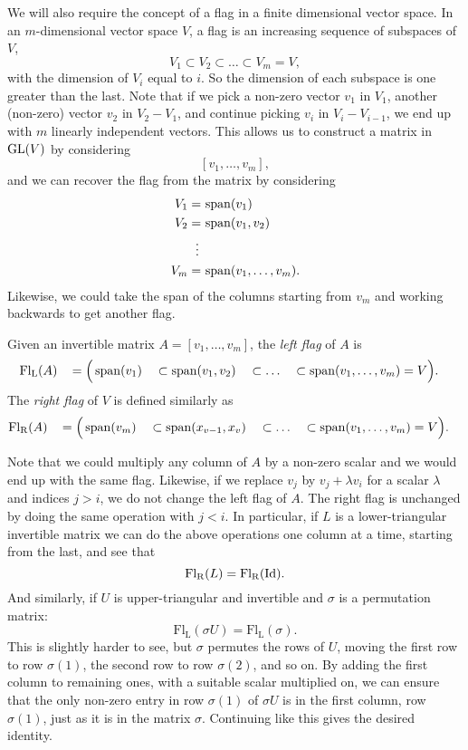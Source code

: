 We will also require the concept of a flag in a finite
dimensional vector space. In an
$m$-dimensional vector space $V$, a flag is an increasing sequence of
subspaces of $V$,
\[ V_1 \subset V_2 \subset \dots \subset V_m = V, \]
with the dimension of $V_i$ equal to $i$. So the dimension of each
subspace is one greater than the last. Note that if we pick a non-zero
vector $v_1$ in $V_1$, another (non-zero) vector $v_2$ in $V_2 - V_1$,
and continue picking $v_i$ in $V_i - V_{i-1}$, we end up with $m$
linearly independent vectors. This allows us to construct a matrix in
$\operatorname{GL}(V)$ by considering
\[ [v_1,\dots,v_m], \]
and we can recover the flag from the matrix by considering
\begin{align*}
  V_1 =\, &\operatorname{span}(v_1) \\
  V_2 =\, &\operatorname{span}(v_1,v_2) \\
  \vdots\,\, & \\
  V_m =\, &\operatorname{span}(v_1,\dots,v_m).
\end{align*}
Likewise, we could take the span of the columns starting from $v_m$
and working backwards to get another flag.
\begin{definition}
  Given an invertible matrix $A = [v_1,\dots,v_m]$, the \textit{left
    flag} of $A$ is
  \begin{alignat*}{5}
    \mathrm{Fl_L}(A)\, &&= \Big(&\operatorname{span}(v_1) &&\subset \operatorname{span}(v_1,v_2)
    &&\subset \dots &&\subset \operatorname{span}(v_1,\dots,v_m) = V\Big).
  \end{alignat*}
  The \textit{right flag} of $V$ is defined similarly as
  \begin{alignat*}{5}
    \mathrm{Fl_R}(A)\, &&= \Big(&\operatorname{span}(v_m) &&\subset
    \operatorname{span}(x_{v-1},x_v) &&\subset \dots &&\subset
    \operatorname{span}(v_1,\dots,v_m) = V\Big). 
  \end{alignat*}
\end{definition}
Note that we could multiply any column of $A$ by a non-zero scalar and
we would end up with the same flag. Likewise, if we replace $v_j$ by
$v_j + \lambda v_i$ for a scalar $\lambda$ and indices $j > i$, we do not
change the left flag of $A$. The right flag is unchanged by doing
the same operation with $j < i$. In particular, if $L$ is a
lower-triangular invertible matrix we can do the above operations one
column at a time, starting from the last, and see that
\[ \mathrm{Fl_R}(L) = \mathrm{Fl_R}(\operatorname{Id}). \]
And similarly, if $U$ is upper-triangular and invertible and $\sigma$
is a permutation matrix:
\[ \mathrm{Fl_L}(\sigma U) = \mathrm{Fl_L}(\sigma). \]
This is slightly harder to see, but $\sigma$ permutes the rows of $U$,
moving the first row to row $\sigma(1)$, the second row to row
$\sigma(2)$, and so on. By adding the first column to remaining ones,
with a suitable scalar multiplied on, we can ensure that the only
non-zero entry in row $\sigma(1)$ of $\sigma U$ is in the first
column, row $\sigma(1)$, just as it is in the matrix
$\sigma$. Continuing like this gives the desired identity.


